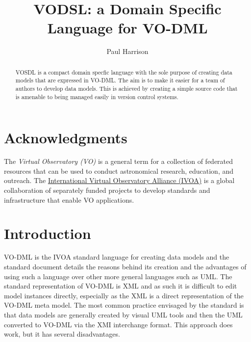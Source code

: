 \documentclass[11pt,a4paper]{ivoa}
\title{VODSL: a Domain Specific Language for VO-DML}
\author[https://wiki.ivoa.net/twiki/bin/view/IVOA/PaulHarrison]{Paul Harrison}
\begin{document}
\begin{abstract}
VOSDL is a compact domain specfic language with the sole purpose of creating data models that are expressed in VO-DML. The aim is to make
it easier for a team of authors to develop data models. This is achieved by creating a simple source code that
is amenable to being managed easily in version control systems.
\end{abstract}


\section*{Acknowledgments}

The \emph{Virtual Observatory (VO)} is a
general term for a collection of federated resources that can be used
to conduct astronomical research, education, and outreach.
The \href{https://www.ivoa.net}{International
Virtual Observatory Alliance (IVOA)} is a global
collaboration of separately funded projects to develop standards and
infrastructure that enable VO applications.


\section{Introduction}

VO-DML is the IVOA standard language for creating data models and the standard document  \cite{2018ivoa.spec.0910L} details the reasons behind its
creation and the advantages of using such a language over other more general languages such as UML. The standard representation of VO-DML is XML and as such
it is difficult to edit model instances directly, especially as the XML is a direct representation of the VO-DML meta model. The most common practice envisaged by the
standard is that data models are generally created by visual UML tools and then the UML converted to VO-DML via the XMI interchange format. This approach does work,
but it has several disadvantages.
\end{document}
